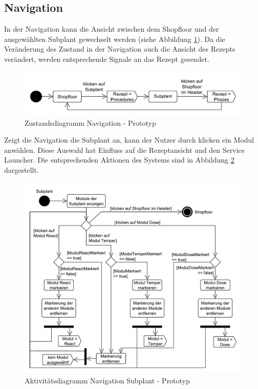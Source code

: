 \subsection{Navigation}
In der Navigation kann die Ansicht zwischen dem Shopfloor und der ausgewählten Subplant  gewechselt werden (siehe Abbildung \ref{pic:Zustandsdiagramm-Navigation}). Da die Veränderung des Zustand in der Navigation auch die Ansicht des Rezepts verändert, werden entsprechende Signale an das Rezept gesendet.
\begin{figure}[htbp]
\centering
\includegraphics[scale=0.65]{DA_files/UML/Prototyp/Zustandsdiagramm-Navigation.pdf}
\caption{Zustandsdiagramm Navigation - Prototyp}
\label{pic:Zustandsdiagramm-Navigation}
\end{figure}

Zeigt die Navigation die Subplant an, kann der Nutzer durch klicken ein Modul anwählen. Diese Auswahl hat Einfluss auf die Rezeptansicht und den Service Launcher. Die entsprechenden Aktionen des Systems sind in Abbildung \ref{pic:Aktivitaetsdiagramm-Navigation-Subplant} dargestellt.
\begin{figure}[htbp]
\centering
\includegraphics[scale=0.6]{DA_files/UML/Prototyp/Aktivitaetsdiagramm-Navigation-Module.pdf}
\caption{Aktivitätsdiagramm Navigation Subplant - Prototyp}
\label{pic:Aktivitaetsdiagramm-Navigation-Subplant}
\end{figure}

